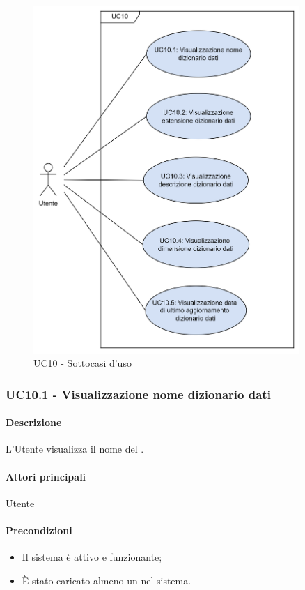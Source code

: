 \begin{figure}[H]
  \centering
  \includegraphics[width=0.90\textwidth]{assets/uc10.png}
  \caption{UC10 - Sottocasi d'uso}
\end{figure}


\subsubsection{UC10.1 - Visualizzazione nome dizionario dati}\label{UC10point1}
\paragraph*{Descrizione}
L'Utente visualizza il nome del .

\paragraph*{Attori principali}
Utente

\paragraph*{Precondizioni}
\begin{itemize}
  \item Il sistema è attivo e funzionante;
  \item È stato caricato almeno un  nel sistema. 
\end{itemize}

